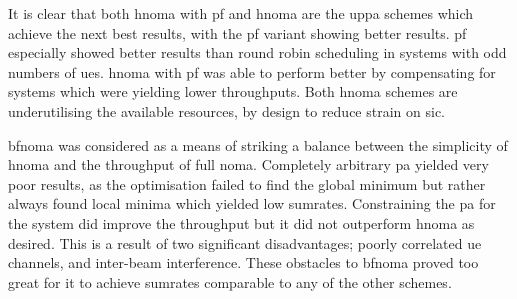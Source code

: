 \par
It is clear that both \ac{hnoma} with \ac{pf} and \ac{hnoma} are the \ac{uppa} schemes which achieve the next best results, with the \ac{pf} variant showing better results.
\ac{pf} especially showed better results than round robin scheduling in systems with odd numbers of \acp{ue}.
\ac{hnoma} with \ac{pf} was able to perform better by compensating for systems which were yielding lower throughputs.
Both \ac{hnoma} schemes are underutilising the available resources, by design to reduce strain on \ac{sic}.

\par
\ac{bfnoma} was considered as a means of striking a balance between the simplicity of \ac{hnoma} and the throughput of full \ac{noma}.
Completely arbitrary \ac{pa} yielded very poor results, as the optimisation failed to find the global minimum but rather always found local minima which yielded low sumrates.
Constraining the \ac{pa} for the system did improve the throughput but it did not outperform \ac{hnoma} as desired.
This is a result of two significant disadvantages; poorly correlated \ac{ue} channels, and inter-beam interference.
These obstacles to \ac{bfnoma} proved too great for it to achieve sumrates comparable to any of the other schemes.

